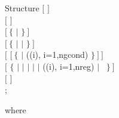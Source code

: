 \begin{DataStructure}{Structure }
$[$   $]$ \\
$[$   $]$ \\
$[~\{$  $|$  $\}~]$ \\
$[~\{$   $|$   $|$   $\}~]$ \\
$[$  $[~\{$  $|$ ((i), i=1,ngcond) $\}~]~]$ \\
$[$  $\{$  $|$  $|$  $|$  $|$  $|$ ((i), i=1,nreg) $|$
 ~$\}~]$ \\
$[$  $]$ \\
;
\end{DataStructure}
\goodbreak
\noindent where
